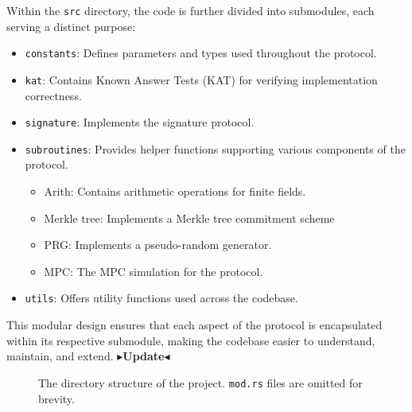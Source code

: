 \documentclass[11pt]{report}
\theoremstyle{definition}
\theoremstyle{plain}
\newcommand{\todo}[1]{{\color[rgb]{.5,0,0}\textbf{$\blacktriangleright$#1$\blacktriangleleft$}}}
\begin{document}
Within the \texttt{src} directory, the code is further divided into submodules, each serving a distinct purpose:

\begin{itemize}
  \item \texttt{constants}: Defines parameters and types used throughout the protocol.
  \item \texttt{kat}: Contains Known Answer Tests (KAT) for verifying implementation correctness.
  \item \texttt{signature}: Implements the signature protocol.
  \item \texttt{subroutines}: Provides helper functions supporting various components of the protocol.
        \begin{itemize}
          \item Arith: Contains arithmetic operations for finite fields.
          \item Merkle tree: Implements a Merkle tree commitment scheme
          \item PRG: Implements a pseudo-random generator.
          \item MPC: The MPC simulation for the protocol.
        \end{itemize}
  \item \texttt{utils}: Offers utility functions used across the codebase.
\end{itemize}

This modular design ensures that each aspect of the protocol is encapsulated within its respective submodule, making the codebase easier to understand, maintain, and extend. \todo{Update}
\begin{figure}[H]
  \caption{The directory structure of the project. \texttt{mod.rs} files are omitted for brevity.}
  \label{fig:structure}
\end{figure}
\end{document}
